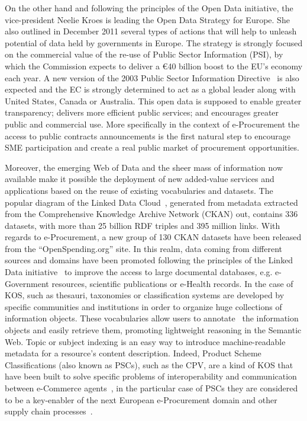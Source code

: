 On the other hand and following the principles of the Open Data initiative, the vice-president Neelie Kroes is leading the Open Data Strategy for Europe. 
She also outlined in December 2011 several types of actions that will help to unleash potential of data held by governments in Europe. The strategy is 
strongly focused on the commercial value of the re-use of Public Sector Information (PSI), by which the Commission expects to deliver a \euro 40 billion boost to the EU's economy each year. 
A new version of the 2003 Public Sector Information Directive~\cite{d2003} is also expected and the EC is strongly determined to act as a global leader along with United States, 
Canada or Australia. This open data is supposed to enable greater transparency; delivers more efficient public services; and encourages greater 
public and commercial use. More specifically in the context of e-Procurement the access to public contracts announcements is the first natural 
step to encourage SME participation and create a real public market of procurement opportunities.


Moreover, the emerging Web of Data and the sheer mass of information now available make it possible the deployment of new 
added-value services and applications based on the reuse of existing vocabularies and datasets. 
The popular diagram of the Linked Data Cloud~\cite{linked-data-cloud}, generated from metadata extracted from the 
Comprehensive Knowledge Archive Network (CKAN) out, contains $336$ datasets, with more than 25 billion RDF triples and 395 million links. 
With regards to e-Procurement, a new group of 130 CKAN datasets have been released from the ``OpenSpending.org'' site. In this realm, 
data coming from different sources and domains have been promoted following the principles of the 
Linked Data initiative~\cite{Berners-Lee-2006} to improve the access to large documental databases, 
e.g. e-Government resources, scientific publications or e-Health records. In the case of KOS, such as thesauri, taxonomies or classification systems 
are developed by specific communities and institutions in order to organize huge collections of information objects. 
These vocabularies allow users to annotate~\cite{Leukel-standard,Leukel-automating,Leukel-comparative} the information objects and easily retrieve them, 
promoting lightweight reasoning in the Semantic Web. Topic or subject indexing is an easy way to introduce machine-readable metadata for a resource's content 
description. Indeed, Product Scheme Classifications (also known as PSCs), such as the CPV, are a kind of KOS that have been built to solve specific problems 
of interoperability and communication between e-Commerce agents~\cite{FenselOmel2001,Leukel-findings}, in the particular case of PSCs they are considered to be a key-enabler of 
the next European e-Procurement domain and other supply chain processes~\cite{DBLP:journals/tcci/Alor-HernandezAJPRMBG10}.

